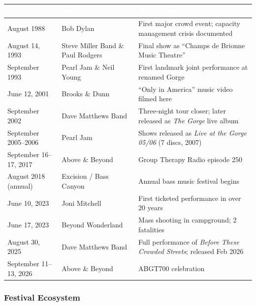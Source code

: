 \documentclass[11pt,letterpaper]{article}
\newcommand{\tableheader}[1]{\textbf{\sffamily\textcolor{white}{#1}}}
\begin{document}
\begin{center}
\begin{tabularx}{\textwidth}{L{2.5cm}L{4cm}X}
\toprule
{}
\tableheader{Date} & \tableheader{Artist/Event} & \tableheader{Significance} \\
\midrule
August 1988 & Bob Dylan & First major crowd event; capacity management crisis documented \\
August 14, 1993 & Steve Miller Band \& Paul Rodgers & Final show as ``Champs de Brionne Music Theatre'' \\
September 1993 & Pearl Jam \& Neil Young & First landmark joint performance at renamed Gorge \\
June 12, 2001 & Brooks \& Dunn & ``Only in America'' music video filmed here \\
September 2002 & Dave Matthews Band & Three-night tour closer; later released as \textit{The Gorge} live album \\
September 2005--2006 & Pearl Jam & Shows released as \textit{Live at the Gorge 05/06} (7 discs, 2007) \\
September 16--17, 2017 & Above \& Beyond & Group Therapy Radio episode 250 \\
August 2018 (annual) & Excision / Bass Canyon & Annual bass music festival begins \\
June 10, 2023 & Joni Mitchell & First ticketed performance in over 20 years \\
June 17, 2023 & Beyond Wonderland & Mass shooting in campground; 2 fatalities \\
August 30, 2025 & Dave Matthews Band & Full performance of \textit{Before These Crowded Streets}; released Feb 2026 \\
September 11--13, 2026 & Above \& Beyond & ABGT700 celebration \\
\bottomrule
\end{tabularx}
\end{center}

\subsubsection{Festival Ecosystem}
\end{document}
